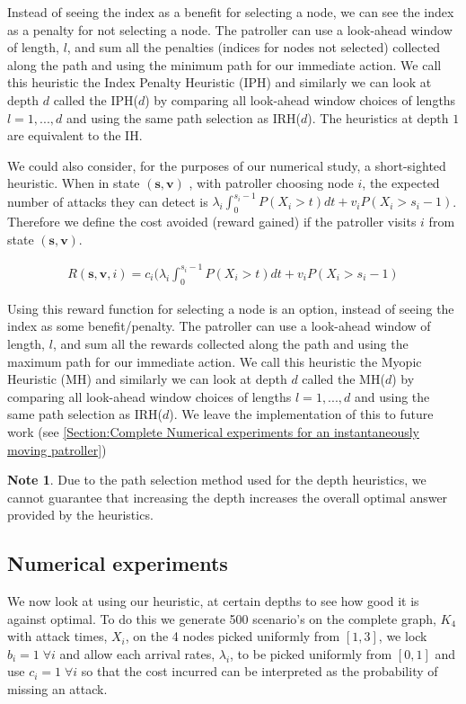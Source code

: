 \documentclass[a4paper,10pt]{article}
\theoremstyle{definition}
\theoremstyle{definition}
\theoremstyle{remark}
\theoremstyle{definition}
\newtheorem*{note}{Note}
\begin{document}
Instead of seeing the index as a benefit for selecting a node, we can see the index as a penalty for not selecting a node. The patroller can use a look-ahead window of length, $l$, and sum all the penalties (indices for nodes not selected) collected along the path and using the minimum path for our immediate action. We call this heuristic the Index Penalty Heuristic (IPH) and similarly we can look at depth $d$ called the IPH($d$) by comparing all look-ahead window choices of lengths $l=1,...,d$ and using the same path selection as IRH($d$). The heuristics at depth $1$ are equivalent to the IH.

We could also consider, for the purposes of our numerical study, a short-sighted heuristic. When in state $(\bm{s},\bm{v})$ , with patroller choosing node $i$, the expected number of attacks they can detect is $\lambda_{i} \int_{0}^{s_{i}-1} P(X_{i} > t ) dt + v_{i} P(X_{i} > s_{i}-1)$. Therefore we define the cost avoided (reward gained) if the patroller visits $i$ from state $(\bm{s},\bm{v})$.

\begin{align*}
R(\bm{s},\bm{v},i)= c_{i} ( \lambda_{i} \int_{0}^{s_{i}-1} P(X_{i} > t ) dt + v_{i} P(X_{i} > s_{i}-1)
\end{align*}

Using this reward function for selecting a node is an option, instead of seeing the index as some benefit/penalty. The patroller can use a look-ahead window of length, $l$, and sum all the rewards collected along the path and using the maximum path for our immediate action. We call this heuristic the Myopic Heuristic (MH) and similarly we can look at depth $d$ called the MH($d$) by comparing all look-ahead window choices of lengths $l=1,...,d$ and using the same path selection as IRH($d$). We leave the implementation of this to future work (see \ref{Section:Complete Numerical experiments for an instantaneously moving patroller})

\begin{note}
Due to the path selection method used for the depth heuristics, we cannot guarantee that increasing the depth increases the overall optimal answer provided by the heuristics.
\end{note}

\subsection{Numerical experiments}
We now look at using our heuristic, at certain depths to see how good it is against optimal. To do this we generate 500 scenario's on the complete graph, $K_{4}$ with attack times, $X_{i}$, on the 4 nodes picked uniformly from $[1,3]$, we lock $b_{i}=1 \; \forall i$ and allow each arrival rates, $\lambda_{i}$, to be picked uniformly from $[0,1]$ and use $c_{i}=1 \; \forall i$ so that the cost incurred can be interpreted as the probability of missing an attack.
\end{document}
